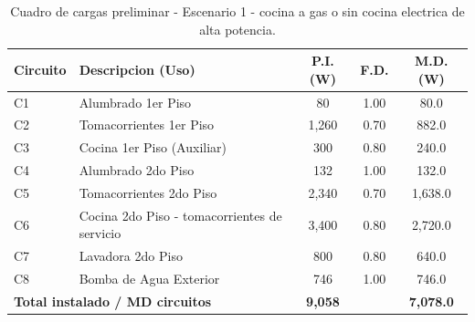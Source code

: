\begin{table}[H]
\centering
\caption{Cuadro de cargas preliminar - Escenario 1 - cocina a gas o sin cocina electrica de alta potencia.}
\label{tab:cuadro-cargas-cocina-gas}
\begin{small}
\begin{tabular}{l l c c c}
\toprule
\textbf{Circuito} & \textbf{Descripcion (Uso)} & \textbf{P.I. (W)} & \textbf{F.D.} & \textbf{M.D. (W)} \\
\midrule
C1 & Alumbrado 1er Piso & 80 & 1.00 & 80.0 \\
C2 & Tomacorrientes 1er Piso & 1,260 & 0.70 & 882.0 \\
C3 & Cocina 1er Piso (Auxiliar) & 300 & 0.80 & 240.0 \\
C4 & Alumbrado 2do Piso & 132 & 1.00 & 132.0 \\
C5 & Tomacorrientes 2do Piso & 2,340 & 0.70 & 1,638.0 \\
C6 & Cocina 2do Piso - tomacorrientes de servicio & 3,400 & 0.80 & 2,720.0 \\
C7 & Lavadora 2do Piso & 800 & 0.80 & 640.0 \\
C8 & Bomba de Agua Exterior & 746 & 1.00 & 746.0 \\
\midrule
\multicolumn{2}{l}{\textbf{Total instalado / MD circuitos}} & \textbf{9,058} & & \textbf{7,078.0} \\
\bottomrule
\end{tabular}
\end{small}
\end{table}